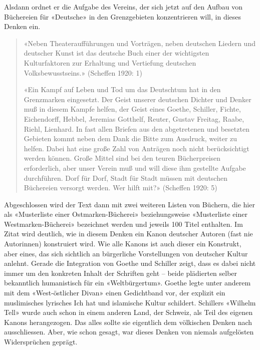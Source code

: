 \documentclass[a4paper,
fontsize=11pt,
oneside,
numbers=noperiodatend,
parskip=half-,
bibliography=totoc,
final
]{scrartcl}
\begin{document}
Alsdann ordnet er die Aufgabe des Vereins, der sich jetzt auf den Aufbau
von Büchereien für «Deutsche» in den Grenzgebieten konzentrieren will,
in dieses Denken ein.

\begin{quote}
«Neben Theateraufführungen und Vorträgen, neben deutschen Liedern und
deutscher Kunst ist das deutsche Buch einer der wichtigsten
Kulturfaktoren zur Erhaltung und Vertiefung deutschen
Volksbewusstseins.» (Scheffen 1920: 1)

«Ein Kampf auf Leben und Tod um das Deutschtum hat in den Grenzmarken
eingesetzt. Der Geist unserer deutschen Dichter und Denker muß in diesem
Kampfe helfen, der Geist eines Goethe, Schiller, Fichte, Eichendorff,
Hebbel, Jeremias Gotthelf, Reuter, Gustav Freitag, Raabe, Riehl,
Lienhard. In fast allen Briefen aus den abgetretenen und besetzten
Gebieten kommt neben dem Dank die Bitte zum Ausdruck, weiter zu helfen.
Dabei hat eine große Zahl von Anträgen noch nicht berücksichtigt werden
können. Große Mittel sind bei den teuren Bücherpreisen erforderlich,
aber unser Verein muß und will diese ihm gestellte Aufgabe durchführen.
Dorf für Dorf, Stadt für Stadt müssen mit deutschen Büchereien versorgt
werden. Wer hilft mit?» (Scheffen 1920: 5)
\end{quote}

Abgeschlossen wird der Text dann mit zwei weiteren Listen von Büchern,
die hier als «Musterliste einer Ostmarken-Bücherei» beziehungsweise
«Musterliste einer Westmarken-Bücherei» bezeichnet werden und jeweils
100 Titel enthalten. Im Zitat wird deutlich, wie in diesem Denken ein
Kanon deutscher Autoren (fast nie Autorinnen) konstruiert wird. Wie alle
Kanons ist auch dieser ein Konstrukt, aber eines, das sich sichtlich an
bürgerliche Vorstellungen von deutscher Kultur anlehnt. Gerade die
Integration von Goethe und Schiller zeigt, dass es dabei nicht immer um
den konkreten Inhalt der Schriften geht -- beide plädierten selber
bekanntlich humanistisch für ein «Weltbürgertum». Goethe legte unter
anderem mit dem «West-östlicher Divan» einen Gedichtband vor, der
explizit ein muslimisches lyrisches Ich hat und islamische Kultur
schildert. Schillers «Wilhelm Tell» wurde auch schon in einem anderen
Land, der Schweiz, als Teil des eigenen Kanons herangezogen. Das alles
sollte sie eigentlich dem völkischen Denken nach ausschliessen. Aber,
wie schon gesagt, war dieses Denken von niemals aufgelösten
Widersprüchen geprägt.
\end{document}
